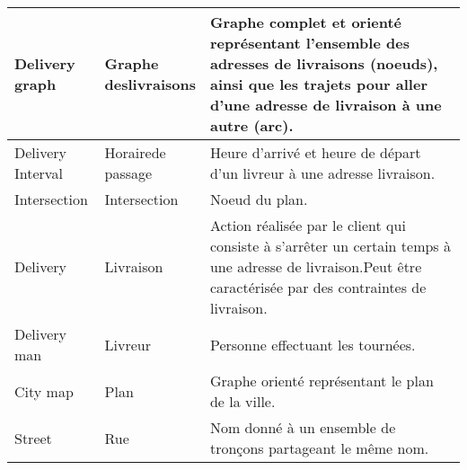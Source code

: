 \begin{table}[]
\begin{longtable}{|p{0.2\linewidth}|p{0.2\linewidth}|p{0.6\linewidth}|}
Delivery graph                              & Graphe deslivraisons           & Graphe complet et orienté représentant l'ensemble des adresses de livraisons (noeuds), ainsi que les trajets pour aller d'une adresse de livraison à une autre (arc).                                                                                                                \\ \hline
Delivery Interval                           & Horairede passage              & Heure d'arrivé et heure de départ d'un livreur à une adresse livraison.                                                                                                                                                                                                             \\ \hline
Intersection                                & Intersection                   & Noeud du plan.                                                                                                                                                                                                                                                                      \\ \hline
Delivery                                    & Livraison                      & Action réalisée par le client qui consiste à s'arrêter un certain temps à une adresse de livraison.Peut être caractérisée par des contraintes de livraison.                                                                                                                         \\ \hline
Delivery man                                & Livreur                        & Personne effectuant les tournées.                                                                                                                                                                                                                                                   \\ \hline
City map                                    & Plan                           & Graphe orienté représentant le plan de la ville.                                                                                                                                                                                                                                    \\ \hline
Street                                      & Rue                            & Nom donné à un ensemble de tronçons partageant le même nom.                                                                                                                                                                                                                         \\ \hline

\end{longtable}
\end{table}
